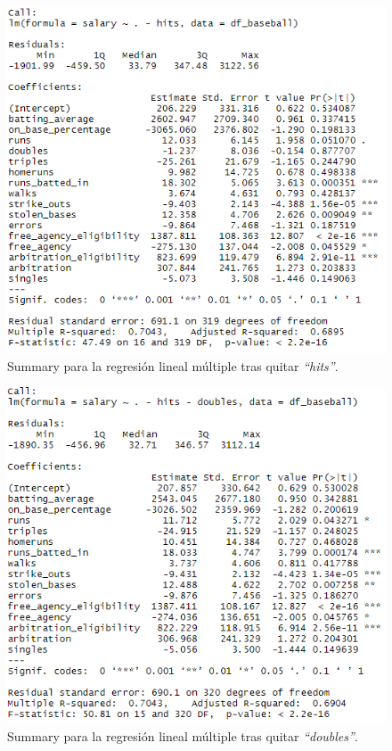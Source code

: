\documentclass[a4paper,12pt, oneside]{book}
\begin{document}
\begin{figure}[H]
\centering
\includegraphics[scale=0.7]{images/multifit2.PNG}
\caption{Summary para la regresión lineal múltiple tras quitar \textit{``hits''}.}
\end{figure}

\begin{figure}[H]
\centering
\includegraphics[scale=0.7]{images/multifit3.PNG}
\caption{Summary para la regresión lineal múltiple tras quitar \textit{``doubles''}.}
\end{figure}
\end{document}
